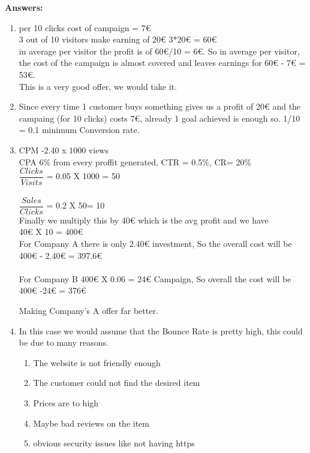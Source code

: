 \documentclass{WeSTassignment}
\begin{document}
\textbf{Answers:}
\begin{enumerate}
\item per 10 clicks cost of campaign = 7€
\\ 3 out of 10 visitors make earning of 20€   3*20€ = 60€
\\ in average per visitor the profit is of 60€/10 = 6€. So in average per visitor, the cost of the campaign is almost covered and leaves earnings for 60€ - 7€ =  53€. \\
This is a very good offer, we would take it.

\item Since every time 1 customer buys something gives us a profit of 20€ and the campaing (for 10 clicks) costs 7€, already 1 goal achieved is enough so.
1/10 = 0.1 minimum Conversion rate.

\item CPM -2.40 x 1000 views
\\ CPA 6\% from every proffit generated, CTR = 0.5\%, CR= 20\%\\

$\dfrac{Clicks}{Visits}$ = 0.05 X 1000 = 50\\\\
$\dfrac{Sales}{Clicks}$ = 0.2 X 50= 10\\

Finally we multiply this by 40€ which is the avg profit and we have
\\ 40€ X 10 = 400€ \\

For Company A there is only 2.40€ investment, So the overall cost will be 400€ - 2.40€ = 397.6€ \\
\\For Company B 400€ X 0.06 = 24€ Campaign, So overall the cost will be 400€ -24€ = 376€

Making Company's A offer far better.

\item In this case we would assume that the Bounce Rate is pretty high, this could be due to many reasons.
\begin{enumerate}
\item The website is not friendly enough
\item The customer could not find the desired item
\item Prices are to high
\item Maybe bad reviews on the item
\item obvious security issues like not having https
\end{enumerate}
\end{enumerate}
\end{document}

